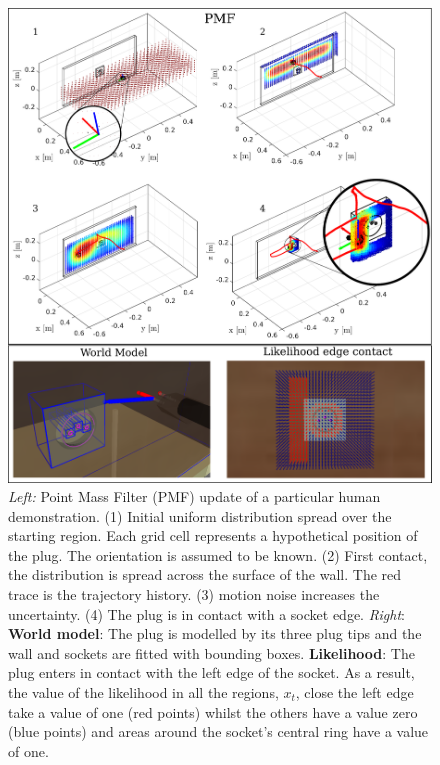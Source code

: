 \begin{figure}
 \centering
   \includegraphics[width=\textwidth]{./ch4-PiH/Figures/PMF/pmf_likelihood_v2.pdf}
   \caption{\textit{Left:} Point Mass Filter (PMF) update of a particular human demonstration. (1) Initial uniform distribution spread over the starting 
   region. Each grid cell represents a hypothetical position of the plug. The orientation is assumed to be known. (2) First contact, the distribution 
   is spread across the surface of the wall. The red trace is the trajectory history. (3) motion noise increases the uncertainty. (4) The plug is in contact with a socket edge.
   \textit{Right}: \textbf{World model}: The plug is modelled by its three plug tips and the wall and sockets are fitted with bounding boxes.
   \textbf{Likelihood}: The plug enters in contact with the left edge of the socket. As a result, the value of the likelihood in all the regions, $x_t$, close the left edge take 
   a value of one (red points)  whilst the others have a value zero (blue points) and areas around the socket's central 
   ring have a value of one. }
  \label{fig:PMF}
\end{figure}

